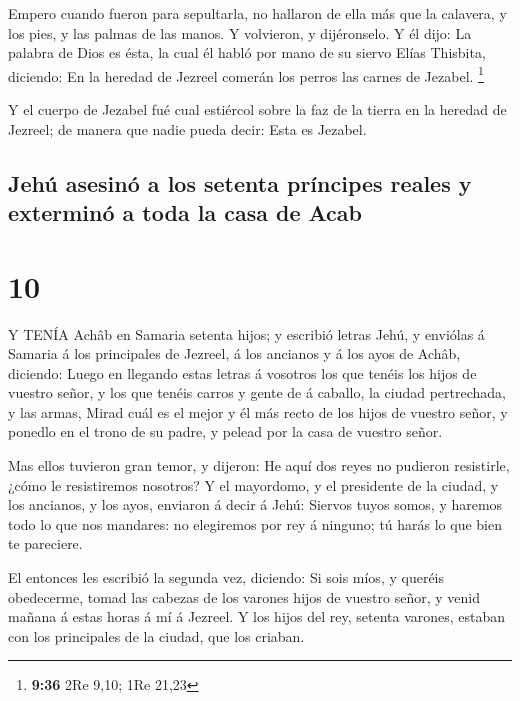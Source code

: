  Empero cuando fueron para sepultarla, no hallaron de ella
más que la calavera, y los pies, y las palmas de las manos.
 Y volvieron, y dijéronselo. Y él dijo: La palabra de Dios
es ésta, la cual él habló por mano de su siervo Elías Thisbita,
diciendo: En la heredad de Jezreel comerán los perros las carnes de
Jezabel. \footnote{\textbf{9:36} 2Re 9,10; 1Re 21,23}

 Y el cuerpo de Jezabel fué cual estiércol sobre la faz de
la tierra en la heredad de Jezreel; de manera que nadie pueda decir:
Esta es Jezabel.

\hypertarget{jehuxfa-asesinuxf3-a-los-setenta-pruxedncipes-reales-y-exterminuxf3-a-toda-la-casa-de-acab}{%
\subsection{Jehú asesinó a los setenta príncipes reales y exterminó a
toda la casa de
Acab}\label{jehuxfa-asesinuxf3-a-los-setenta-pruxedncipes-reales-y-exterminuxf3-a-toda-la-casa-de-acab}}

\hypertarget{section-9}{%
\section{10}\label{section-9}}

 Y TENÍA Achâb en Samaria setenta hijos; y escribió letras
Jehú, y enviólas á Samaria á los principales de Jezreel, á los ancianos
y á los ayos de Achâb, diciendo:  Luego en llegando estas
letras á vosotros los que tenéis los hijos de vuestro señor, y los que
tenéis carros y gente de á caballo, la ciudad pertrechada, y las armas,
 Mirad cuál es el mejor y él más recto de los hijos de
vuestro señor, y ponedlo en el trono de su padre, y pelead por la casa
de vuestro señor.

 Mas ellos tuvieron gran temor, y dijeron: He aquí dos reyes
no pudieron resistirle, ¿cómo le resistiremos nosotros?  Y
el mayordomo, y el presidente de la ciudad, y los ancianos, y los ayos,
enviaron á decir á Jehú: Siervos tuyos somos, y haremos todo lo que nos
mandares: no elegiremos por rey á ninguno; tú harás lo que bien te
pareciere.

 El entonces les escribió la segunda vez, diciendo: Si sois
míos, y queréis obedecerme, tomad las cabezas de los varones hijos de
vuestro señor, y venid mañana á estas horas á mí á Jezreel. Y los hijos
del rey, setenta varones, estaban con los principales de la ciudad, que
los criaban.

